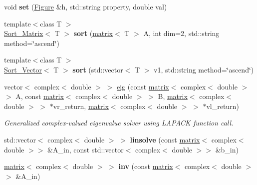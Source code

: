 \begin{DoxyCompactItemize}
\item 
\hypertarget{namespacekeycpp_afcd6ae07fc18f5374868fe314f00108c}{void {\bfseries set} (\hyperlink{classkeycpp_1_1_figure}{Figure} \&h, std\-::string property, double val)}\label{namespacekeycpp_afcd6ae07fc18f5374868fe314f00108c}

\item 
\hypertarget{namespacekeycpp_a6862448bf6e09309e60a6ba7aa0caf9a}{{\footnotesize template$<$class T $>$ }\\\hyperlink{structkeycpp_1_1_sort___matrix}{Sort\-\_\-\-Matrix}$<$ T $>$ {\bfseries sort} (\hyperlink{classkeycpp_1_1matrix}{matrix}$<$ T $>$ A, int dim=2, std\-::string method=\char`\"{}ascend\char`\"{})}\label{namespacekeycpp_a6862448bf6e09309e60a6ba7aa0caf9a}

\item 
\hypertarget{namespacekeycpp_a1be4e97b99a996a01f428fd8ba048fb0}{{\footnotesize template$<$class T $>$ }\\\hyperlink{structkeycpp_1_1_sort___vector}{Sort\-\_\-\-Vector}$<$ T $>$ {\bfseries sort} (std\-::vector$<$ T $>$ v1, std\-::string method=\char`\"{}ascend\char`\"{})}\label{namespacekeycpp_a1be4e97b99a996a01f428fd8ba048fb0}

\item 
vector$<$ complex$<$ double $>$ $>$ \hyperlink{namespacekeycpp_a190640edb8e634de02d302d94a29ee17}{eig} (const \hyperlink{classkeycpp_1_1matrix}{matrix}$<$ complex$<$ double $>$ $>$ A, const \hyperlink{classkeycpp_1_1matrix}{matrix}$<$ complex$<$ double $>$ $>$ B, \hyperlink{classkeycpp_1_1matrix}{matrix}$<$ complex$<$ double $>$ $>$ $\ast$vr\-\_\-return, \hyperlink{classkeycpp_1_1matrix}{matrix}$<$ complex$<$ double $>$ $>$ $\ast$vl\-\_\-return)
\begin{DoxyCompactList}\small\item\em Generalized complex-\/valued eigenvalue solver using L\-A\-P\-A\-C\-K function call. \end{DoxyCompactList}\item 
\hypertarget{namespacekeycpp_acea0bb8f128ef0cdf55a79c50ceccb83}{std\-::vector$<$ complex$<$ double $>$ $>$ {\bfseries linsolve} (const \hyperlink{classkeycpp_1_1matrix}{matrix}$<$ complex$<$ double $>$$>$ \&A\-\_\-in, const std\-::vector$<$ complex$<$ double $>$$>$ \&b\-\_\-in)}\label{namespacekeycpp_acea0bb8f128ef0cdf55a79c50ceccb83}

\item 
\hypertarget{namespacekeycpp_ac9cabca49e9650ae8b5aadf5ee2f7f4e}{\hyperlink{classkeycpp_1_1matrix}{matrix}$<$ complex$<$ double $>$ $>$ {\bfseries inv} (const \hyperlink{classkeycpp_1_1matrix}{matrix}$<$ complex$<$ double $>$$>$ \&A\-\_\-in)}\label{namespacekeycpp_ac9cabca49e9650ae8b5aadf5ee2f7f4e}

\end{DoxyCompactItemize}


